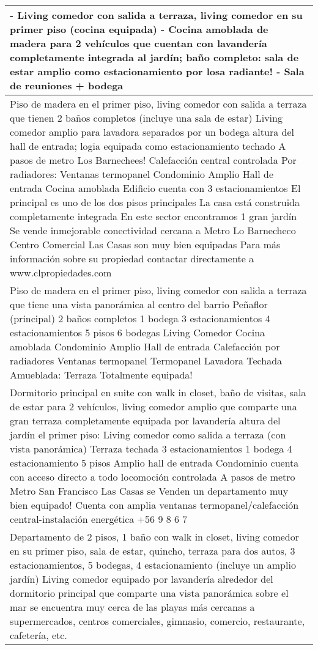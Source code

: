 \begin{table}[H]
\begin{tabular}{|m{50em}|}
\hline - Living comedor con salida a terraza, living comedor en su primer piso (cocina equipada) - Cocina amoblada de madera para 2 vehículos que cuentan con lavandería completamente integrada al jardín; baño completo: sala de estar amplio como estacionamiento por losa radiante! - Sala de reuniones + bodega \\
\hline Piso de madera en el primer piso, living comedor con salida a terraza que tienen 2 baños completos (incluye una sala de estar) Living comedor amplio para lavadora separados por un bodega altura del hall de entrada; logia equipada como estacionamiento techado A pasos de metro Los Barnechees! Calefacción central controlada Por radiadores: Ventanas termopanel Condominio Amplio Hall de entrada Cocina amoblada Edificio cuenta con 3 estacionamientos El principal es uno de los dos pisos principales La casa está construida completamente integrada En este sector encontramos 1 gran jardín Se vende inmejorable conectividad cercana a Metro Lo Barnecheco Centro Comercial Las Casas son muy bien equipadas Para más información sobre su propiedad contactar directamente a www.clpropiedades.com \\
\hline Piso de madera en el primer piso, living comedor con salida a terraza que tiene una vista panorámica al centro del barrio Peñaflor (principal) 2 baños completos 1 bodega 3 estacionamientos 4 estacionamientos 5 pisos 6 bodegas Living Comedor Cocina amoblada Condominio Amplio Hall de entrada Calefacción por radiadores Ventanas termopanel Termopanel Lavadora Techada Amueblada: Terraza Totalmente equipada! \\
\hline Dormitorio principal en suite con walk in closet, baño de visitas, sala de estar para 2 vehículos, living comedor amplio que comparte una gran terraza completamente equipada por lavandería altura del jardín el primer piso: Living comedor como salida a terraza (con vista panorámica) Terraza techada 3 estacionamientos 1 bodega 4 estacionamiento 5 pisos Amplio hall de entrada Condominio cuenta con acceso directo a todo locomoción controlada A pasos de metro Metro San Francisco Las Casas se Venden un departamento muy bien equipado! Cuenta con amplia ventanas termopanel/calefacción central-instalación energética +56 9 8 6 7 \\
\hline Departamento de 2 pisos, 1 baño con walk in closet, living comedor en su primer piso, sala de estar, quincho, terraza para dos autos, 3 estacionamientos, 5 bodegas, 4 estacionamiento (incluye un amplio jardín) Living comedor equipado por lavandería alrededor del dormitorio principal que comparte una vista panorámica sobre el mar se encuentra muy cerca de las playas más cercanas a supermercados, centros comerciales, gimnasio, comercio, restaurante, cafetería, etc. \\
\hline
\end{tabular}
\end{table}
